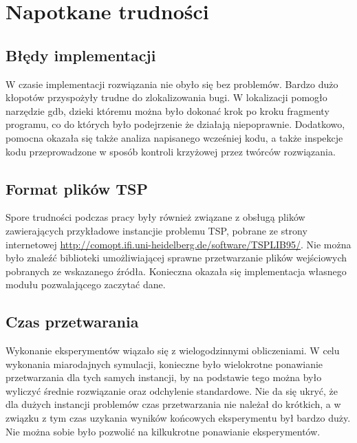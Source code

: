 \section{Napotkane trudności}

\subsection{Błędy implementacji}

W czasie implementacji rozwiązania nie obyło się bez problemów. Bardzo
dużo kłopotów przyspożyły trudne do zlokalizowania bugi. W lokalizacji
pomogło narzędzie gdb, dzieki któremu można było dokonać krok po kroku
fragmenty programu, co do których było podejrzenie że działają niepoprawnie.
Dodatkowo, pomocna okazała się także analiza napisanego wcześniej kodu,
a także inspekcje kodu przeprowadzone w sposób kontroli krzyżowej
przez twórców rozwiązania.

\subsection{Format plików TSP}

Spore trudności podczas pracy były również związane z obsługą plików 
zawierających przykładowe instancjie problemu TSP, pobrane ze strony
internetowej \url{http://comopt.ifi.uni-heidelberg.de/software/TSPLIB95/}.
Nie można było znaleźć biblioteki umożliwiającej sprawne przetwarzanie
plików wejściowych pobranych ze wskazanego źródła. Konieczna okazała
się implementacja własnego modułu pozwalającego zaczytać dane.

\subsection {Czas przetwarania}

Wykonanie eksperymentów wiązało się z wielogodzinnymi obliczeniami. W
celu wykonania miarodajnych symulacji, konieczne było wielokrotne
ponawianie przetwarzania dla tych samych instancji, by na podstawie
tego można było wyliczyć średnie rozwiązanie oraz odchylenie
standardowe. Nie da się ukryć, że dla dużych instancji problemów
czas przetwarzania nie należał do krótkich, a w związku z tym
czas uzykania wyników końcowych eksperymentu był bardzo duży. Nie można
sobie było pozwolić na kilkukrotne ponawianie eksperymentów.
